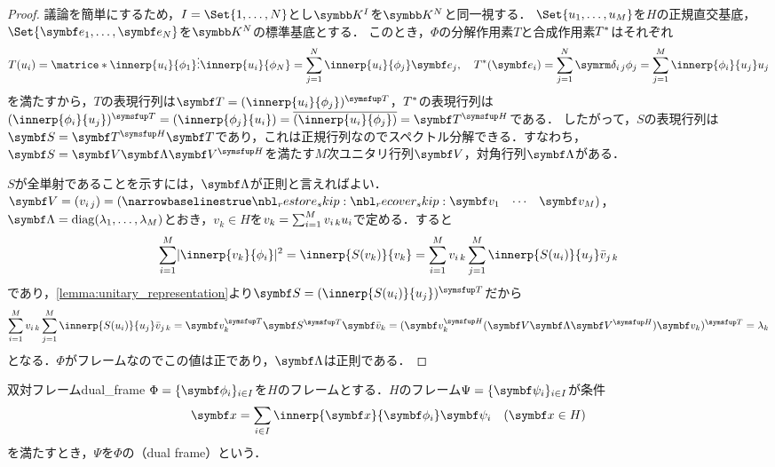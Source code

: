 \documentclass[../../main]{subfiles}
\begin{document}
\begin{proof}
  議論を簡単にするため，\(I=\Set{1,\dots,N}\)とし\(\mapset{I}{\numset{K}}\)を\(\numset{K}^N\)と同一視する．
  \(\Set{u_1,\dots,u_M}\)を\(H\)の正規直交基底，\(\Set{\vect{e}_1,\dots,\vect{e}_N}\)を\(\numset{K}^N\)の標準基底とする．
  このとき，\(\Phi\)の分解作用素\(T\)と合成作用素\(T^{\mathord{\ast}}\)はそれぞれ
  \[
    T(u_i) = \matrice*{\innerp{u_i}{\phi_1} \\ \vdots \\ \innerp{u_i}{\phi_N}}
    = \sum_{j=1}^N\innerp{u_i}{\phi_j}\vect{e}_j,
    \quad\synth{T}(\vect{e}_i) = \sum_{j=1}^N\kdelta{i}{j}\phi_j
    = \sum_{j=1}^M\innerp{\phi_i}{u_j}u_j
  \]
  を満たすから，\(T\)の表現行列は\(\mat{T}=\trps{\matfence{\innerp{u_i}{\phi_j}}}\)，\(T^{\mathord{\ast}}\)の表現行列は\(\trps{\matfence{\innerp{\phi_i}{u_j}}}=\matfence{\innerp{\phi_j}{u_i}}=\conj*{\matfence{\innerp{u_i}{\phi_j}}}=\htrps{\mat{T}}\)である．
  したがって，\(S\)の表現行列は\(\mat{S}=\htrps{\mat{T}}\mat{T}\)であり，これは正規行列なのでスペクトル分解できる．すなわち，\(\mat{S}=\mat{V}\mat{\Lambda}\htrps{\mat{V}}\)を満たす\(M\)次ユニタリ行列\(\mat{V}\)，対角行列\(\mat{\Lambda}\)がある．

  \(S\)が全単射であることを示すには，\(\mat{\Lambda}\)が正則と言えればよい．\(\mat{V}=\matfence{\midx{v}{i}{j}}=\rowvect{\vect{v}_1 & \cdots & \vect{v}_M}\)，\(\mat{\Lambda}=\diag(\lambda_1,\dots,\lambda_M)\)とおき，\(v_k\in H\)を\(v_k=\sum_{i=1}^Mv_{i\,k}u_i\)で定める．すると
  \[
    \sum_{i=1}^M\abs{\innerp{v_k}{\phi_i}}^2 = \innerp{S(v_k)}{v_k}
    = \sum_{i=1}^M\midx{v}{i}{k}\sum_{j=1}^M\innerp{S(u_i)}{u_j}\midx{\conj{v}}{j}{k}
  \]
  であり，\cref{lemma:unitary_representation}より\(\mat{S}=\trps{\matfence{\innerp{S(u_i)}{u_j}}}\)だから
  \[
    \sum_{i=1}^M\midx{v}{i}{k}\sum_{j=1}^M\innerp{S(u_i)}{u_j}\midx{\conj{v}}{j}{k} = \trps{\vect{v}_k}\trps{\mat{S}}\vect{\conj{v}}_k
    = \trps{(\htrps{\vect{v}_k}(\mat{V}\mat{\Lambda}\htrps{\mat{V}})\vect{v}_k)}
    = \lambda_k
  \]
  となる．\(\Phi\)がフレームなのでこの値は正であり，\(\mat{\Lambda}\)は正則である．
\end{proof}

\begin{definition}{双対フレーム}{dual_frame}
  \(\Phi=\seq{\vect{\phi}_i}_{i\in I}\)を\(H\)のフレームとする．\(H\)のフレーム\(\Psi=\seq{\vect{\psi}_i}_{i\in I}\)が条件
  \[
    \vect{x} = \sum_{i\in I}\innerp{\vect{x}}{\vect{\phi}_i}\vect{\psi}_i\quad(\vect{x}\in H)
  \]
  を満たすとき，\(\Psi\)を\(\Phi\)の（dual frame）という．
\end{definition}
\end{document}
